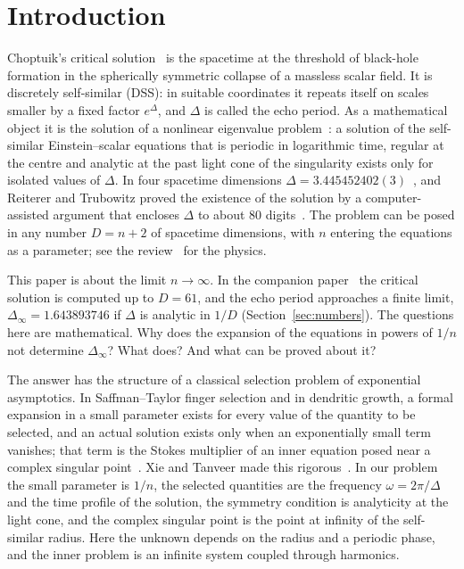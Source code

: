 \documentclass{amsart}
\numberwithin{equation}{section}
\theoremstyle{plain}
\theoremstyle{definition}
\theoremstyle{remark}
\newcommand{\Dinf}{\Delta_\infty}
\begin{document}
\maketitle

\setcounter{tocdepth}{2}
\tableofcontents

\section{Introduction}
\label{sec:intro}

Choptuik's critical solution~\cite{Choptuik1993} is the spacetime at the threshold of black-hole formation in the
spherically symmetric collapse of a massless scalar field. It is discretely self-similar (DSS): in suitable
coordinates it repeats itself on scales smaller by a fixed factor $e^{\Delta}$, and $\Delta$ is called the echo period.
As a mathematical object it is the solution of a nonlinear eigenvalue problem~\cite{Gundlach1995}: a solution of the
self-similar Einstein--scalar equations that is periodic in logarithmic time, regular at the centre and analytic at the
past light cone of the singularity exists only for isolated values of $\Delta$. In four spacetime dimensions
$\Delta = 3.445452402(3)$~\cite{MartinGarciaGundlach2003}, and Reiterer and Trubowitz proved the existence of the solution
by a computer-assisted argument that encloses $\Delta$ to about $80$ digits~\cite{ReitererTrubowitz2019}. The problem
can be posed in any number $D = n + 2$ of spacetime dimensions, with $n$ entering the equations as a parameter; see the
review~\cite{GundlachReview2025} for the physics.

This paper is about the limit $n \to \infty$. In the companion paper~\cite{companion} the critical solution is
computed up to $D = 61$, and the echo period approaches a finite limit, $\Dinf = 1.643893746$ if $\Delta$ is analytic in $1/D$
(Section~\ref{sec:numbers}).
The questions here are mathematical. Why does the expansion of the equations in powers of $1/n$ not determine $\Dinf$?
What does? And what can be proved about it?

The answer has the structure of a classical selection problem of exponential asymptotics. In Saffman--Taylor finger
selection and in dendritic growth, a formal expansion in a small parameter exists for every value of the quantity to
be selected, and an actual solution exists only when an exponentially small term vanishes; that term is the Stokes
multiplier of an inner equation posed near a complex singular point~\cite{Combescot1986,HongLanger1986,KruskalSegur1991}.
Xie and Tanveer made this rigorous~\cite{XieTanveer2003,TanveerXie2003,Xie2019}. In our problem the small parameter is
$1/n$, the selected quantities are the frequency $\omega = 2\pi/\Delta$ and the time profile of the solution, the
symmetry condition is analyticity at the light cone, and the complex singular point is the point at infinity of the
self-similar radius. Here the unknown depends on the radius and a periodic phase, and the inner problem is an infinite
system coupled through harmonics.
\end{document}
